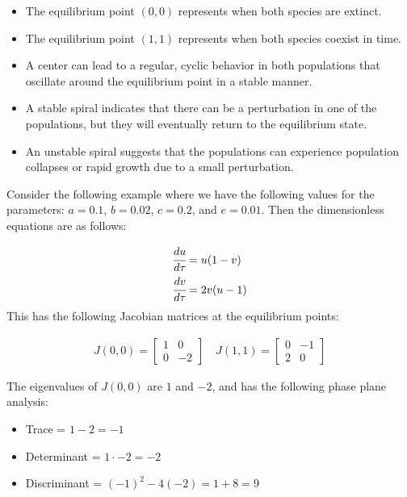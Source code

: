 \documentclass[11pt, letterpaper]{article}
\begin{document}
\begin{itemize}
    \item The equilibrium point $(0, 0)$ represents when both species are
          extinct.
    \item The equilibrium point $(1, 1)$ represents when both species coexist
          in time.
    \item A center can lead to a regular, cyclic behavior in both populations
          that oscillate around the equilibrium point in a stable manner.
    \item A stable spiral indicates that there can be a perturbation in one of
          the populations, but they will eventually return to the equilibrium
          state.
    \item An unstable spiral suggests that the populations can experience
          population collapses or rapid growth due to a small perturbation.
\end{itemize}

Consider the following example where we have the following values for the
parameters: $a = 0.1$, $b = 0.02$, $c = 0.2$, and $e = 0.01$. Then the
dimensionless
equations are as follows:

\begin{align*}
    \cfrac{du}{d\tau} & = u(1 - v) \\
    \cfrac{dv}{d\tau} & = 2v(u-1)
\end{align*}
This has the following Jacobian matrices at the equilibrium points:

\begin{align*}
    J(0, 0) = \begin{bmatrix}
                  1 & 0  \\
                  0 & -2
              \end{bmatrix}
    \quad
    J(1, 1) = \begin{bmatrix}
                  0 & -1 \\
                  2 & 0
              \end{bmatrix}
\end{align*}

The eigenvalues of $J(0, 0)$ are $1$ and $-2$, and has the following phase
plane analysis:
\begin{itemize}
    \item Trace = $1 - 2 = -1$
    \item Determinant = $1 \cdot -2 = -2$
    \item Discriminant = $(-1)^2 - 4(-2) = 1 + 8 = 9$
\end{itemize}
\end{document}

